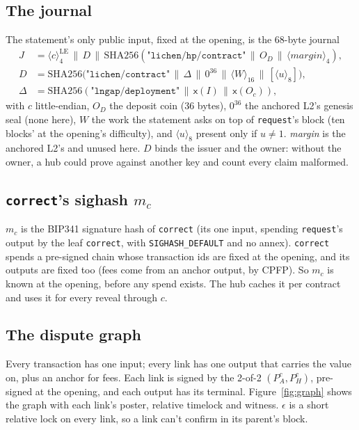 \documentclass[11pt]{article}
\theoremstyle{plain}
\theoremstyle{definition}
\newcommand{\tx}[1]{\texttt{#1}}
\newcommand{\cat}{\,\|\,}
\newcommand{\be}[2]{\langle #1\rangle_{#2}}          %
\newcommand{\xo}[1]{\mathsf{x}(#1)}                  %
\newcommand{\PH}{P_H^{c}}
\newcommand{\Oc}{O_c}
\begin{document}
\subsection{The journal}\label{sec:journal}

The statement's only public input, fixed at the opening, is the 68-byte
journal
\begin{align*}
  J &= \be{c}{4}^{\mathrm{LE}} \cat D \cat \mathrm{SHA256}(\texttt{"lichen/hp/contract"} \cat O_D \cat \be{\mathit{margin}}{4}),\\
  D &= \mathrm{SHA256}\big(\texttt{"lichen/contract"} \cat \Delta \cat 0^{36} \cat \be{W}{16} \cat [\be{u}{8}]\big),\\
  \Delta &= \mathrm{SHA256}(\texttt{"lngap/deployment"} \cat \xo{I} \cat \xo{\Oc}),
\end{align*}
with $c$ little-endian, $O_D$ the deposit coin (36 bytes), $0^{36}$ the
anchored L2's genesis seal (none here), $W$ the work the statement asks
on top of \tx{request}'s block (ten blocks' at the opening's
difficulty), and $\be{u}{8}$ present only if $u \ne 1$. \emph{margin}
is the anchored L2's and unused here. $D$ binds the issuer and the
owner: without the owner, a hub could prove against another key and
count every claim malformed.

\subsection{\tx{correct}'s sighash $m_c$}\label{sec:mc}

$m_c$ is the BIP341 signature hash of \tx{correct} (its one input,
spending \tx{request}'s output by the leaf \tx{correct}, with
\tx{SIGHASH\_DEFAULT} and no annex). \tx{correct} spends a pre-signed
chain whose transaction ids are fixed at the opening, and its outputs
are fixed too (fees come from an anchor output, by CPFP). So $m_c$ is
known at the opening, before any spend exists. The hub caches it per
contract and uses it for every reveal through $c$.

\subsection{The dispute graph}\label{sec:graph}

Every transaction has one input; every link has one output that carries
the value on, plus an anchor for fees. Each link is signed by the 2-of-2
$(P_A^c, \PH)$, pre-signed at the opening, and each output has its
terminal. Figure~\ref{fig:graph} shows the graph with each link's
poster, relative timelock and witness. $\epsilon$ is a short relative
lock on every link, so a link can't confirm in its parent's block.
\end{document}
